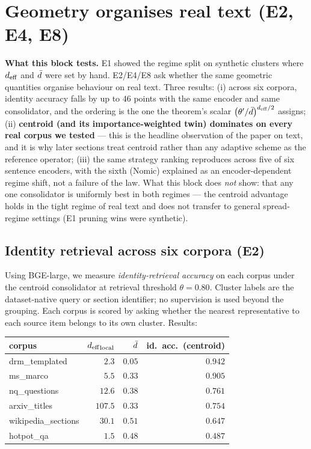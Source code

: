 \section{Geometry organises real text (E2, E4, E8)}
\label{sec:template_collapse}

\begin{intuition}
\textbf{What this block tests.} E1 showed the regime split on
synthetic clusters where ${d_{\mathrm{eff}}}$ and $\bar{d}$ were set by hand.
E2/E4/E8 ask whether the same geometric quantities organise
behaviour on real text. Three results: (i) across six corpora,
identity accuracy falls by up to $46$ points with the same encoder
and same consolidator, and the ordering is the one the theorem's
scalar $\bigl(\theta'/\bar{d}\bigr)^{{d_{\mathrm{eff}}}/2}$ assigns; (ii)
\textbf{centroid (and its importance-weighted twin) dominates on
every real corpus we tested} --- this is the headline observation
of the paper on text, and it is why later sections treat centroid
rather than any adaptive scheme as the reference operator; (iii)
the same strategy ranking reproduces across five of six sentence
encoders, with the sixth (Nomic) explained as an
encoder-dependent regime shift, not a failure of the law. What
this block does \emph{not} show: that any one consolidator is
uniformly best in both regimes --- the centroid advantage holds
in the tight regime of real text and does not transfer to
general spread-regime settings (E1 pruning wins were synthetic).
\end{intuition}

\subsection{Identity retrieval across six corpora (E2)}
\label{sec:template_collapse:e2}

Using BGE-large, we measure \emph{identity-retrieval accuracy} on each
corpus under the centroid consolidator at retrieval threshold $\theta =
0.80$. Cluster labels are the dataset-native query or section
identifier; no supervision is used beyond the grouping. Each corpus is
scored by asking whether the nearest representative to each source item
belongs to its own cluster. Results:

\begin{center}
\begin{tabular}{lrrr}
\toprule
corpus & ${d_{\mathrm{eff}}}_{\mathrm{local}}$ & $\bar{d}$ & id.\ acc.\ (centroid) \\
\midrule
drm\_templated       & $\phantom{00}2.3$ & $0.05$ & $0.942$ \\
ms\_marco            & $\phantom{00}5.5$ & $0.33$ & $0.905$ \\
nq\_questions        & $\phantom{0}12.6$ & $0.38$ & $0.761$ \\
arxiv\_titles        & $107.5$           & $0.33$ & $0.754$ \\
wikipedia\_sections  & $\phantom{0}30.1$ & $0.51$ & $0.647$ \\
hotpot\_qa           & $\phantom{00}1.5$ & $0.48$ & $0.487$ \\
\bottomrule
\end{tabular}
\end{center}

